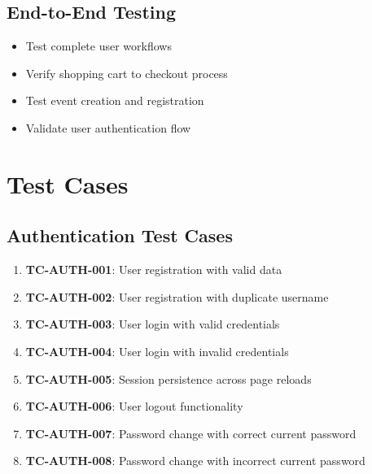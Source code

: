 \documentclass{scrreprt}
\begin{document}
\subsection{End-to-End Testing}
\begin{itemize}
\item Test complete user workflows
\item Verify shopping cart to checkout process
\item Test event creation and registration
\item Validate user authentication flow
\end{itemize}

\section{Test Cases}

\subsection{Authentication Test Cases}
\begin{enumerate}
\item \textbf{TC-AUTH-001}: User registration with valid data
\item \textbf{TC-AUTH-002}: User registration with duplicate username
\item \textbf{TC-AUTH-003}: User login with valid credentials
\item \textbf{TC-AUTH-004}: User login with invalid credentials
\item \textbf{TC-AUTH-005}: Session persistence across page reloads
\item \textbf{TC-AUTH-006}: User logout functionality
\item \textbf{TC-AUTH-007}: Password change with correct current password
\item \textbf{TC-AUTH-008}: Password change with incorrect current password
\end{enumerate}
\end{document}
